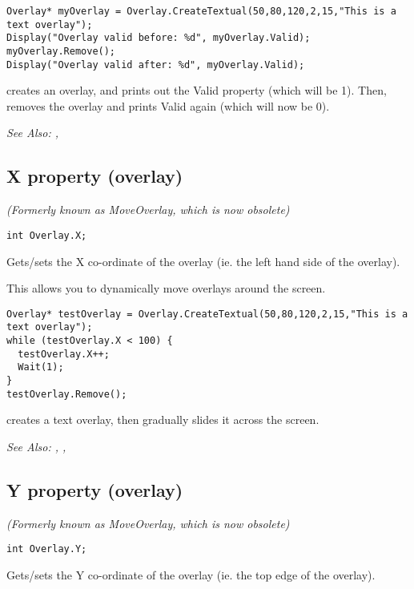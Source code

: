 \begin{verbatim}
Overlay* myOverlay = Overlay.CreateTextual(50,80,120,2,15,"This is a text overlay");
Display("Overlay valid before: %d", myOverlay.Valid);
myOverlay.Remove();
Display("Overlay valid after: %d", myOverlay.Valid);
\end{verbatim}
creates an overlay, and prints out the Valid property (which will be 1). Then, removes
the overlay and prints Valid again (which will now be 0).

\it{See Also:} ,



\subsection{X property (overlay)}\label{Overlay.X}%

\it{(Formerly known as MoveOverlay, which is now obsolete)}

\begin{verbatim}
int Overlay.X;
\end{verbatim}
Gets/sets the X co-ordinate of the overlay (ie. the left hand side of the overlay).

This allows you to dynamically move overlays around the screen.

\begin{verbatim}
Overlay* testOverlay = Overlay.CreateTextual(50,80,120,2,15,"This is a text overlay");
while (testOverlay.X < 100) {
  testOverlay.X++;
  Wait(1);
}
testOverlay.Remove();
\end{verbatim}
creates a text overlay, then gradually slides it across the screen.

\it{See Also:} ,
, 


\subsection{Y property (overlay)}\label{Overlay.Y}%

\it{(Formerly known as MoveOverlay, which is now obsolete)}

\begin{verbatim}
int Overlay.Y;
\end{verbatim}
Gets/sets the Y co-ordinate of the overlay (ie. the top edge of the overlay).

